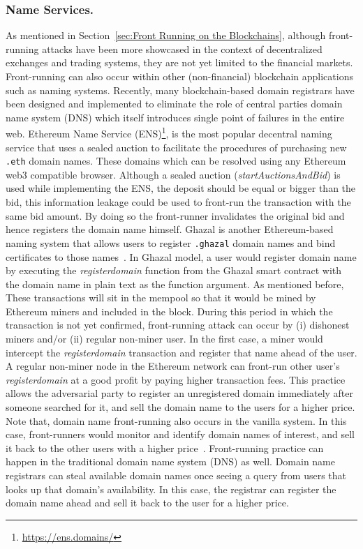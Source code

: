 \subsubsection{Name Services.}
\noindent As mentioned in Section~\ref{sec:Front Running on the Blockchains}, although front-running attacks have been more showcased in the context of decentralized exchanges and trading systems, they are not yet limited to the financial markets. Front-running can also occur within other (non-financial) blockchain applications such as naming systems. Recently, many blockchain-based domain registrars have been designed and implemented to eliminate the role of central parties \ie domain name system (DNS) which itself introduces single point of failures in the entire web. Ethereum Name Service (ENS)\footnote{\url{https://ens.domains/}}, is the most popular decentral naming service that uses a sealed auction to facilitate the procedures of purchasing new \texttt{.eth} domain names. These domains which can be resolved using any Ethereum web3 compatible browser. Although a sealed auction (\textit{startAuctionsAndBid}) is used while implementing the ENS, the deposit should be equal or bigger than the bid, this information leakage could be used to front-run the transaction with the same bid amount. By doing so the front-runner invalidates the original bid and hence registers the domain name himself. Ghazal is another Ethereum-based naming system that allows users to register \texttt{.ghazal} domain names and bind certificates to those names~\cite{moosavighazal}.  In Ghazal model, a user would register domain name by executing the \textit{registerdomain} function from the Ghazal smart contract with the domain name in plain text as the function argument. As mentioned before, These transactions will sit in the mempool so that it would be mined by Ethereum miners and included in the block. During this period in which the transaction is not yet confirmed, front-running attack can occur by (i) dishonest miners and/or (ii) regular non-miner user. In the first case, a miner would intercept the \textit{registerdomain} transaction and register that name ahead of the user. A regular non-miner node in the Ethereum network can front-run other user's \textit{registerdomain} at a good profit by paying higher transaction fees. This practice allows the adversarial party  to register an unregistered domain immediately after someone searched for it, and sell the domain name to the users for a higher price. Note that, domain name front-running also occurs in the vanilla system. In this case, front-runners would monitor and identify domain names of interest, and sell it back to the other users with a higher price~\cite{sac022en33:online}. Front-running practice can happen in the traditional domain name system (DNS) as well. Domain name registrars can steal available domain names once seeing a query from users that looks up that domain's availability. In this case, the registrar can register the domain name ahead and sell it back to the user for a higher price.

